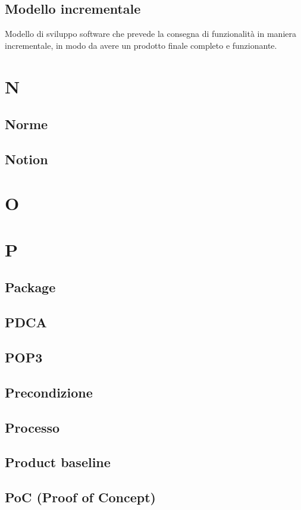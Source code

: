 \documentclass[12pt]{article}
\begin{document}
		\subsection{Modello incrementale}
		Modello di sviluppo software che prevede la consegna di funzionalità in maniera incrementale, in modo da avere un prodotto finale completo e funzionante.

	\clearpage
	\section{N}
		\subsection{Norme}
		\subsection{Notion}
	\clearpage
	\section{O}
	\clearpage
	\section{P}
		\subsection{Package}
		\subsection{PDCA} %
		\subsection{POP3}
		\subsection{Precondizione}
		\subsection{Processo}
		\subsection{Product baseline}
		\subsection{PoC (Proof of Concept)}
\end{document}
